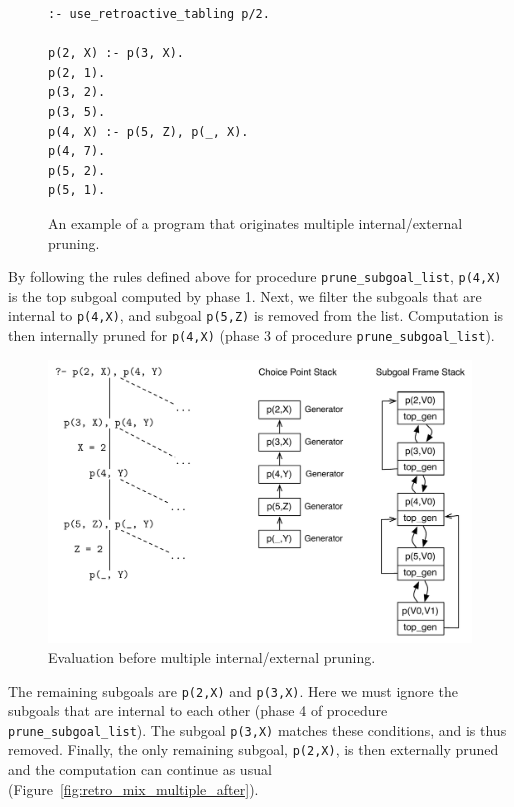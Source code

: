 \begin{figure}[ht]
\begin{Verbatim}
:- use_retroactive_tabling p/2.

p(2, X) :- p(3, X).
p(2, 1).
p(3, 2).
p(3, 5).
p(4, X) :- p(5, Z), p(_, X).
p(4, 7).
p(5, 2).
p(5, 1).
\end{Verbatim}
\caption{An example of a program that originates multiple internal/external pruning.}
\label{fig:retro_mix_program}
\end{figure}

By following the rules defined above for procedure \texttt{prune\_subgoal\_list}, \texttt{p(4,X)}
is the top subgoal computed by phase 1. Next, we filter the subgoals that are internal to \texttt{p(4,X)},
and subgoal \texttt{p(5,Z)} is removed from the list. Computation is then internally pruned for
\texttt{p(4,X)} (phase 3 of procedure \texttt{prune\_subgoal\_list}).

\begin{figure}[ht]
  \centering
    \includegraphics[scale=0.6]{retro_mix_multiple_before.pdf}
  \caption{Evaluation before multiple internal/external pruning.}
  \label{fig:retro_mix_multiple_before}
\end{figure}

The remaining subgoals are \texttt{p(2,X)} and \texttt{p(3,X)}. Here we must ignore the subgoals
that are internal to each other (phase 4 of procedure \texttt{prune\_subgoal\_list}). The subgoal
\texttt{p(3,X)} matches these conditions, and is thus
removed. Finally, the only remaining subgoal, \texttt{p(2,X)}, is then externally pruned and the computation
can continue as usual (Figure~\ref{fig:retro_mix_multiple_after}).

